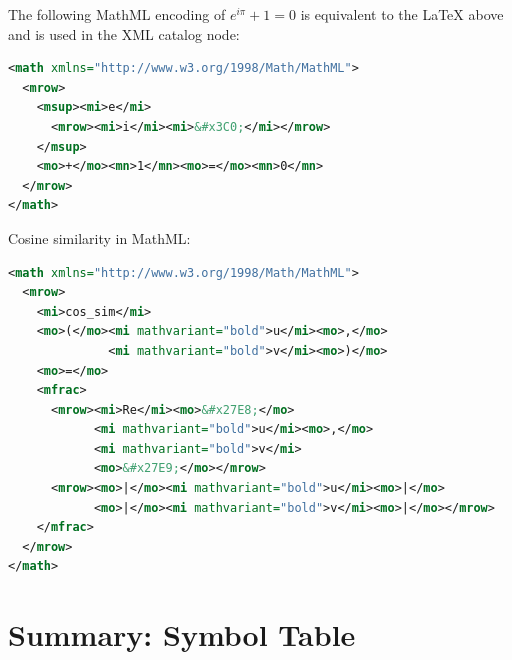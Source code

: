 \documentclass[12pt,a4paper]{article}
\begin{document}
The following MathML encoding of $e^{i\pi}+1=0$ is equivalent to the
\LaTeX{} above and is used in the XML catalog node:

\begin{lstlisting}[language=XML, caption={MathML: Euler's identity}]
<math xmlns="http://www.w3.org/1998/Math/MathML">
  <mrow>
    <msup><mi>e</mi>
      <mrow><mi>i</mi><mi>&#x3C0;</mi></mrow>
    </msup>
    <mo>+</mo><mn>1</mn><mo>=</mo><mn>0</mn>
  </mrow>
</math>
\end{lstlisting}

Cosine similarity in MathML:
\begin{lstlisting}[language=XML, caption={MathML: cosine similarity}]
<math xmlns="http://www.w3.org/1998/Math/MathML">
  <mrow>
    <mi>cos_sim</mi>
    <mo>(</mo><mi mathvariant="bold">u</mi><mo>,</mo>
              <mi mathvariant="bold">v</mi><mo>)</mo>
    <mo>=</mo>
    <mfrac>
      <mrow><mi>Re</mi><mo>&#x27E8;</mo>
            <mi mathvariant="bold">u</mi><mo>,</mo>
            <mi mathvariant="bold">v</mi>
            <mo>&#x27E9;</mo></mrow>
      <mrow><mo>|</mo><mi mathvariant="bold">u</mi><mo>|</mo>
            <mo>|</mo><mi mathvariant="bold">v</mi><mo>|</mo></mrow>
    </mfrac>
  </mrow>
</math>
\end{lstlisting}

\section{Summary: Symbol Table}
\end{document}

